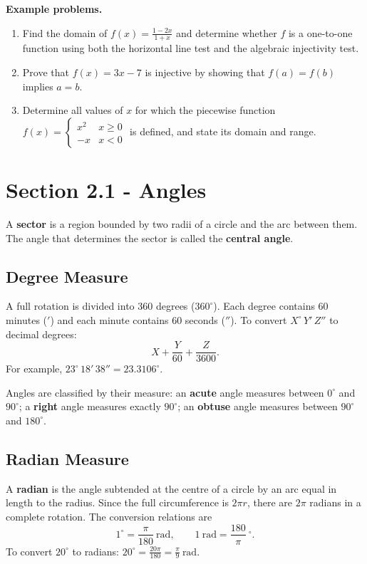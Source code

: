 \textbf{Example problems.}
\begin{enumerate}
    \item Find the domain of $f(x) = \frac{1-2x}{1+x}$ and determine whether $f$ is a one-to-one function using both the horizontal line test and the algebraic injectivity test.
    \item Prove that $f(x) = 3x - 7$ is injective by showing that $f(a) = f(b)$ implies $a = b$.
    \item Determine all values of $x$ for which the piecewise function $f(x) = \begin{cases} x^{2} & x \geq 0 \\ -x & x < 0 \end{cases}$ is defined, and state its domain and range.
\end{enumerate}

\section{Section 2.1 - Angles}
\label{sec:sect-7b60}

A \textbf{sector} is a region bounded by two radii of a circle and the arc
between them.  The angle that determines the sector is called the
\textbf{central angle}.

\subsection*{Degree Measure}

A full rotation is divided into $360$ degrees ($360^{\circ}$).  Each degree
contains $60$ minutes ($'$) and each minute contains $60$ seconds ($''$).  To
convert $X^{\circ}\,Y'\,Z''$ to decimal degrees:
\[
  X + \frac{Y}{60} + \frac{Z}{3600}.
\]
For example, $23^{\circ}\,18'\,38'' = 23.3106^{\circ}$.

Angles are classified by their measure: an \textbf{acute} angle measures
between $0^{\circ}$ and $90^{\circ}$; a \textbf{right} angle measures exactly
$90^{\circ}$; an \textbf{obtuse} angle measures between $90^{\circ}$ and
$180^{\circ}$.

\subsection*{Radian Measure}

A \textbf{radian} is the angle subtended at the centre of a circle by an arc
equal in length to the radius.  Since the full circumference is $2\pi r$,
there are $2\pi$ radians in a complete rotation.  The conversion relations are
\[
  1^{\circ} = \frac{\pi}{180}\ \text{rad}, \qquad
  1\ \text{rad} = \frac{180}{\pi}\ {}^{\circ}.
\]
To convert $20^{\circ}$ to radians: $20^{\circ} = \frac{20\pi}{180} =
\frac{\pi}{9}\ \text{rad}$.

